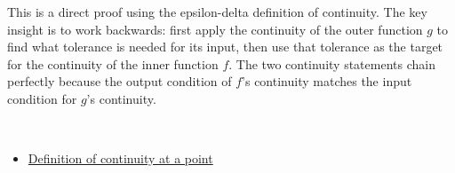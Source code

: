 \begin{remark*}
This is a direct proof using the epsilon-delta definition of continuity. The key insight is to work backwards: first apply the continuity of the outer function $g$ to find what tolerance is needed for its input, then use that tolerance as the target for the continuity of the inner function $f$. The two continuity statements chain perfectly because the output condition of $f$'s continuity matches the input condition for $g$'s continuity.
\end{remark*}

\begin{remark*}[Dependencies]~\\
\begin{itemize}
  \item \hyperref[def:continuous-at-point]{Definition of continuity at a point}
\end{itemize}
\end{remark*}
